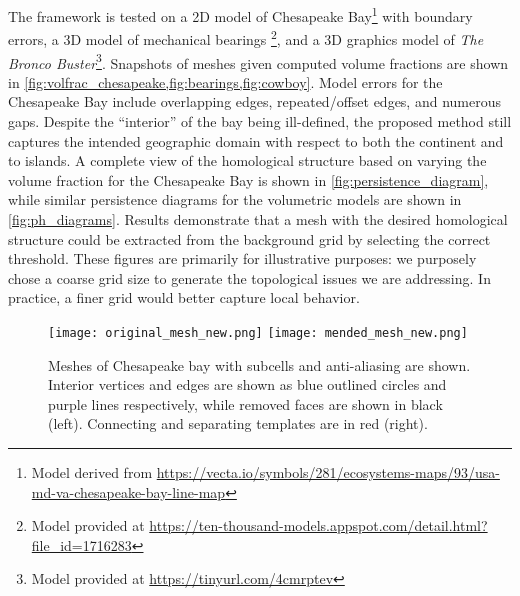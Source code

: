 The framework is tested on a 2D model of Chesapeake Bay\footnote{Model derived from \url{https://vecta.io/symbols/281/ecosystems-maps/93/usa-md-va-chesapeake-bay-line-map}} with boundary errors, a 3D model of mechanical bearings \footnote{Model provided at \url{https://ten-thousand-models.appspot.com/detail.html?file_id=1716283}}, and a 3D graphics model of \emph{The Bronco Buster}\footnote{Model provided at \url{https://tinyurl.com/4cmrptev}}.
Snapshots of meshes given computed volume fractions are shown in \cref{fig:volfrac_chesapeake,fig:bearings,fig:cowboy}.
Model errors for the Chesapeake Bay include overlapping edges, repeated/offset edges, and numerous gaps.
Despite the ``interior'' of the bay being ill-defined, the proposed method still captures the intended geographic domain with respect to both the continent and to islands.
A complete view of the homological structure based on varying the volume fraction for the Chesapeake Bay is shown in \cref{fig:persistence_diagram}, while similar persistence diagrams for the volumetric models are shown in \cref{fig:ph_diagrams}.
Results demonstrate that a mesh with the desired homological structure could be extracted from the background grid by selecting the correct threshold. 
These figures are primarily for illustrative purposes: we purposely chose a coarse grid size to generate the topological issues we are addressing. 
In practice, a finer grid would better capture local behavior.

\begin{figure}
\centering
\texttt{[image: original\_mesh\_new.png]}
\hfill
\texttt{[image: mended\_mesh\_new.png]}
\caption{Meshes of Chesapeake bay with subcells and anti-aliasing are shown. Interior vertices and edges are shown as blue outlined circles and purple lines respectively, while removed faces are shown in black (left). Connecting and separating templates are in red (right). %
}
\label{fig:antialiasing}
\end{figure}
%
%
%

